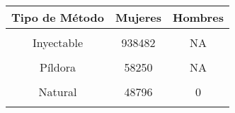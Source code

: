 \begin{tabular}[t]{ccc}
\toprule
\textbf{Tipo de Método} & \textbf{Mujeres} & \textbf{Hombres}\\
\midrule
\cellcolor[HTML]{B6B3FF}{Barrera} & \cellcolor[HTML]{B6B3FF}{48262} & \cellcolor[HTML]{B6B3FF}{25811}\\
Inyectable & 938482 & NA\\
\cellcolor[HTML]{B6B3FF}{DIU} & \cellcolor[HTML]{B6B3FF}{5100} & \cellcolor[HTML]{B6B3FF}{NA}\\
Píldora & 58250 & NA\\
\cellcolor[HTML]{B6B3FF}{Implante subdérmico} & \cellcolor[HTML]{B6B3FF}{32172} & \cellcolor[HTML]{B6B3FF}{NA}\\
Natural & 48796 & 0\\
\cellcolor[HTML]{B6B3FF}{Quirúrgico} & \cellcolor[HTML]{B6B3FF}{4527} & \cellcolor[HTML]{B6B3FF}{166}\\
\bottomrule
\end{tabular}
